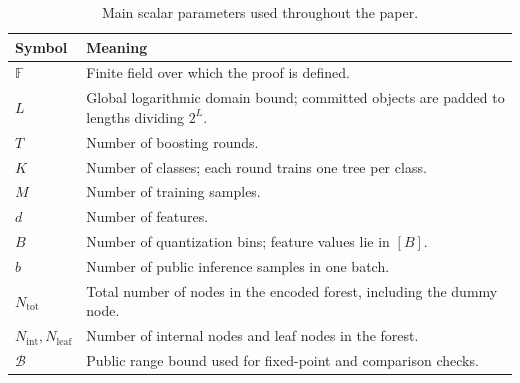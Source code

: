 \begin{table}[t]
    \centering
    \small
    \caption{Main scalar parameters used throughout the paper.}
    \label{tab:main-scalars}
    \begin{tabular}{@{}p{}p{}@{}}
        \toprule
        Symbol & Meaning \\
        \midrule
        $\mathbb{F}$ & Finite field over which the proof is defined. \\
        $L$ & Global logarithmic domain bound; committed objects are padded to lengths dividing $2^L$. \\
        $T$ & Number of boosting rounds. \\
        $K$ & Number of classes; each round trains one tree per class. \\
        $M$ & Number of training samples. \\
        $d$ & Number of features. \\
        $B$ & Number of quantization bins; feature values lie in $[B]$. \\
        $b$ & Number of public inference samples in one batch. \\
        $N_{\mathrm{tot}}$ & Total number of nodes in the encoded forest, including the dummy node. \\
        $N_{\mathrm{int}},N_{\mathrm{leaf}}$ & Number of internal nodes and leaf nodes in the forest. \\
        $\mathcal{B}$ & Public range bound used for fixed-point and comparison checks. \\
        \bottomrule
    \end{tabular}
\end{table}

